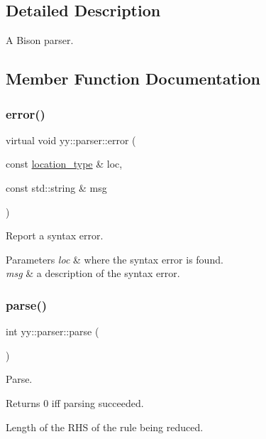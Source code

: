 \subsection{Detailed Description}
A Bison parser. 

\subsection{Member Function Documentation}
\mbox{\label{classyy_1_1parser_a92436afd3e4c5cea48994c7b5c52b7e0}} 
\subsubsection{\texorpdfstring{error()}{error()}}
{\footnotesize\ttfamily virtual void yy\+::parser\+::error (\begin{DoxyParamCaption}\item[{const \hyperlink{classyy_1_1parser_a6cee0517f5ed9774dd68ee189b62e454}{location\+\_\+type} \&}]{loc,  }\item[{const std\+::string \&}]{msg }\end{DoxyParamCaption})\hspace{0.3cm}{\ttfamily [virtual]}}

Report a syntax error. 
\begin{DoxyParams}{Parameters}
{\em loc} & where the syntax error is found. \\
\hline
{\em msg} & a description of the syntax error. \\
\hline
\end{DoxyParams}
\mbox{\label{classyy_1_1parser_ac54cad6da907397a978922bfe246e6f8}} 
\subsubsection{\texorpdfstring{parse()}{parse()}}
{\footnotesize\ttfamily int yy\+::parser\+::parse (\begin{DoxyParamCaption}{ }\end{DoxyParamCaption})\hspace{0.3cm}{\ttfamily [virtual]}}

Parse. \begin{DoxyReturn}{Returns}
0 iff parsing succeeded. 
\end{DoxyReturn}
Length of the R\+HS of the rule being reduced.

